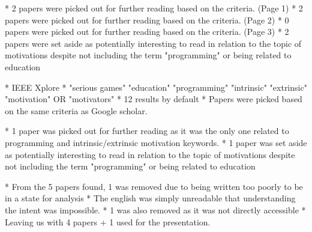         * 2 papers were picked out for further reading based on the criteria. (Page 1)
        * 2 papers were picked out for further reading based on the criteria. (Page 2)
        * 0 papers were picked out for further reading based on the criteria. (Page 3)
        * 2 papers were set aside as potentially interesting to read in relation to the topic of motivations despite not including the term "programming" or being related to education 

    * IEEE Xplore
        * "serious games" "education" "programming" "intrinsic" "extrinsic" "motivation" OR "motivators"
        * 12 results by default
        * Papers were picked based on the same criteria as Google scholar.
        
        * 1 paper was picked out for further reading as it was the only one related to programming and intrinsic/extrinsic motivation keywords. 
        * 1 paper was set aside as potentially interesting to read in relation to the topic of motivations despite not including the term "programming" or being related to education 
        
        
    * From the 5 papers found, 1 was removed due to being written too poorly to be in a state for analysis
        * The english was simply unreadable that understanding the intent was impossible. 
    * 1 was also removed as it was not directly accessible
    * Leaving us with 4 papers + 1 used for the presentation. 